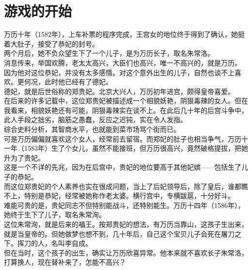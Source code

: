 \section{游戏的开始}
\ifnum{}
	\begin{multicols}{\theparacolNo}
\fi
万历十年（1582年），上车补票的程序完成，王宫女的地位终于得到了确认，她挺着大肚子，接受了恭妃的封号。\\

两个月后，她不负众望生下了一个儿子，是为万历长子，取名朱常洛。\\

消息传来，举国欢腾，老太太高兴，大臣们也高兴，唯一不高兴的，就是万历。\\

因为他对这位恭妃，并没有太多感情。对这个意外出生的儿子，自然也谈不上喜欢。更何况，此时他已经有了德妃。\\

德妃，就是后世俗称的郑贵妃。北京大兴人，万历初年进宫，颇得皇帝喜爱。\\

在后来的许多记载中，这位郑贵妃被描述成一个相貌妖艳，阴狠毒辣的女人。但在我看来，相貌妖艳还有可能，阴狠毒辣实在谈不上。在此后几十年的后宫斗争中，此人手段之拙劣，脑筋之愚蠢，反应之迟钝，实在令人发指。\\

综合史料分析，其智商水平，也就能到菜市场骂个街而已。\\

可是万历偏偏就喜欢这个女人，经常前去留宿。而郑妃的肚子也相当争气，万历十一年（1583年）生了个女儿，虽然不能接班，但万历很高兴，竟然破格提拔，把她升为了贵妃。\\

这是一个不详的先兆，因为在后宫中，贵妃的地位要高于其他妃嫔——包括生了儿子的恭妃。\\

而这位郑贵妃的个人素养也实在很成问题，当上了后妃领导后，除了皇后，谁都瞧不上，特别是恭妃，经常被她称作老太婆。横行宫中，专横跋扈，十分好斗。\\

难能可贵的是，贵妃同志不但特别能战斗，还特别能生。万历十四年（1586年），她终于生下了儿子，取名朱常洵。\\

这位朱常洵，就是后来的福王。按郑贵妃的想法，有万历当靠山，这孩子生出来，就是当皇帝的。但她做梦也想不到，几十年后，自己这个宝贝儿子会死在屠刀之下。挥刀的人，名叫李自成。\\

但在当时，这个孩子的出生，确实让万历欣喜异常。他本来就不喜欢长子朱常洛，打算换人，现在替补来了，怎能不高兴？\\


\end{multicols}
